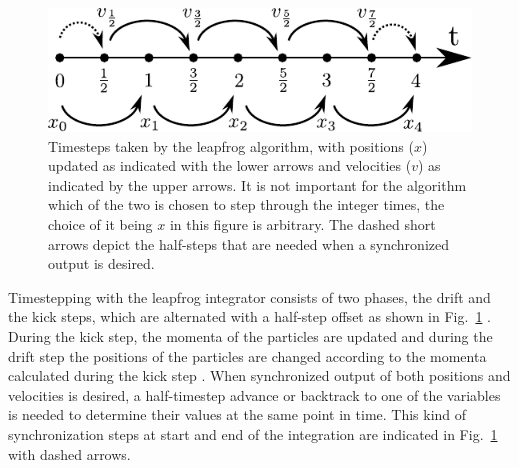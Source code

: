 \documentclass[english, twoside]{HYgradu}
\begin{document}


%    

\begin{figure}
\centering
\includegraphics{kuvat/tex/leapfrog.pdf}
\caption{Timesteps taken by the leapfrog algorithm, with positions ($x$) updated as indicated with the lower arrows and velocities ($v$) as indicated by the upper arrows. It is not important for the algorithm which of the two is chosen to step through the integer times, the choice of it being $x$ in this figure is arbitrary. The dashed short arrows depict the half-steps that are needed when a synchronized output is desired.}\label{fig:leapfrog}
\end{figure}

Timestepping with the leapfrog integrator consists of two phases, the drift and the kick steps, which are alternated with a half-step offset as shown in Fig.\ \ref{fig:leapfrog} \citep{binney2008galactic}. During the kick step, the momenta of the particles are updated and during the drift step the positions of the particles are changed according to the momenta calculated during the kick step \citep{binney2008galactic}. When synchronized output of both positions and velocities is desired, a half-timestep advance or backtrack to one of the variables is needed to determine their values at the same point in time. This kind of synchronization steps at start and end of the integration are indicated in Fig.\ \ref{fig:leapfrog} with dashed arrows.
\end{document}
